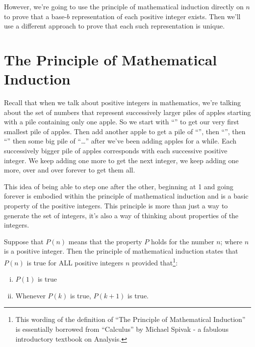 \documentclass{article}
\begin{document}
However, we're going to use
the principle of mathematical induction directly on $n$
to prove that
a base-$b$ representation of each positive integer exists.
Then we'll use a different approach to prove that each such representation is unique.

\section*{The Principle of Mathematical Induction}

Recall that
when we talk about positive integers in mathematics, we're talking about
the set of numbers that
represent successively larger piles of apples starting
with a pile containing only one apple.
So we start with
``\faApple{}'' to get our very first
smallest pile of apples.
Then add another apple to get a pile of ``\faApple{}\faApple{}'',
then ``\faApple{}\faApple{}\faApple{}'',
then ``\faApple{}\faApple{}\faApple{}\faApple{}''
then some big pile of
``\faApple{}\faApple{}\faApple{}\faApple{}\faApple{}\dots{}\faApple{}\faApple{}\faApple{}''
after we've been adding apples for a while.
Each successively bigger pile of apples corresponds with each successive positive integer.
We keep adding one more to get the next integer, we keep adding one more,
over and over forever to get them all.


This idea of being able to step one after the other,
beginning at 1 and going forever is embodied within the principle of mathematical
induction and is a basic property of the positive integers.
This principle is more than just a way to generate the set of integers,
it's also a way of thinking about properties of the integers.

Suppose
that $P(n)$ means that the property $P$ holds
for the number $n$; where $n$ is a positive integer.
Then the principle of mathematical induction states that $P(n)$
is true for ALL positive integers $n$ provided that\footnote{This wording of the
definition of ``The Principle of Mathematical Induction'' is essentially borrowed
from ``Calculus'' by Michael Spivak - a fabulous introductory textbook on Analysis.}:

\begin{enumerate}[i)]
\item $P(1)$ is true
\item Whenever $P(k)$ is true, $P(k+1)$ is true.
\end{enumerate}
\end{document}
